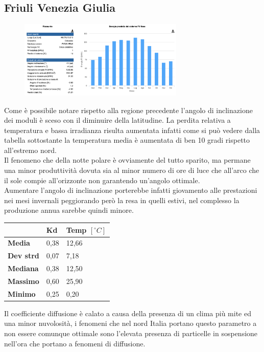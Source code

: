 \subsection{Friuli Venezia Giulia}
\begin{figure}[H]
    \centering
    \includegraphics[width=0.7\textwidth]{res/cap 5/impianto udine}
\end{figure}\noindent
Come è possibile notare rispetto alla regione precedente l'angolo di inclinazione dei moduli è sceso con il diminuire della latitudine. La perdita relativa a temperatura e bassa irradianza risulta aumentata infatti come si può vedere dalla tabella sottostante la temperatura media è aumentata di ben 10 gradi rispetto all'estremo nord.\\
Il fenomeno che della notte polare è ovviamente del tutto sparito, ma permane una minor produttività dovuta sia al minor numero di ore di luce che all'arco che il sole compie all'orizzonte non garantendo un'angolo ottimale.\\
Aumentare l'angolo di inclinazione porterebbe infatti giovamento alle prestazioni nei mesi invernali peggiorando però la resa in quelli estivi, nel complesso la produzione annua sarebbe quindi minore.
\begin{table}[H]
    \centering
    \begin{tabular}{|l|l|l|}
    \hline	
          & \textbf{Kd} & \textbf{Temp $[{}^\circ C]$} \\ \hline
        \textbf{Media} & 0,38 & 12,66 \\ \hline
        \textbf{Dev strd} & 0,07 & 7,18 \\ \hline
        \textbf{Mediana} & 0,38 & 12,50 \\ \hline
        \textbf{Massimo} & 0,60 & 25,90 \\ \hline
        \textbf{Minimo} & 0,25 & 0,20 \\ \hline
    \end{tabular}
\end{table}
Il coefficiente diffusione è calato a causa della presenza di un clima più mite ed una minor nuvolosità, i fenomeni che nel nord Italia portano questo parametro a non essere comunque ottimale sono l'elevata presenza di particelle in sospensione nell'ora che portano a fenomeni di diffusione.
\vfill
\newpage
